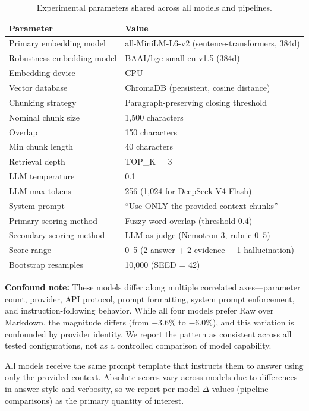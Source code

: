 \documentclass{article}
\begin{document}
\begin{table}[h]
    \centering
    \caption{Experimental parameters shared across all models and pipelines.}
    \label{tab:params}
    \begin{tabular}{ll}
        \toprule
        Parameter & Value \\
        \midrule
        Primary embedding model & all-MiniLM-L6-v2 (sentence-transformers, 384d) \\
        Robustness embedding model & BAAI/bge-small-en-v1.5 (384d) \\
        Embedding device & CPU \\
        Vector database & ChromaDB (persistent, cosine distance) \\
        Chunking strategy & Paragraph-preserving closing threshold \\
        Nominal chunk size & 1,500 characters \\
        Overlap & 150 characters \\
        Min chunk length & 40 characters \\
        Retrieval depth & TOP\_K = 3 \\
        LLM temperature & 0.1 \\
        LLM max tokens & 256 (1,024 for DeepSeek V4 Flash) \\
        System prompt & ``Use ONLY the provided context chunks'' \\
        Primary scoring method & Fuzzy word-overlap (threshold 0.4) \\
        Secondary scoring method & LLM-as-judge (Nemotron 3, rubric 0--5) \\
        Score range & 0--5 (2 answer + 2 evidence + 1 hallucination) \\
        Bootstrap resamples & 10,000 (SEED = 42) \\
        \bottomrule
    \end{tabular}
\end{table}

\textbf{Confound note:} These models differ along multiple correlated axes---parameter count, provider, API protocol, prompt formatting, system prompt enforcement, and instruction-following behavior. While all four models prefer Raw over Markdown, the magnitude differs (from $-$3.6\% to $-$6.0\%), and this variation is confounded by provider identity. We report the pattern as consistent across all tested configurations, not as a controlled comparison of model capability.

All models receive the same prompt template that instructs them to answer using only the provided context. Absolute scores vary across models due to differences in answer style and verbosity, so we report per-model $\Delta$ values (pipeline comparisons) as the primary quantity of interest.
\end{document}
